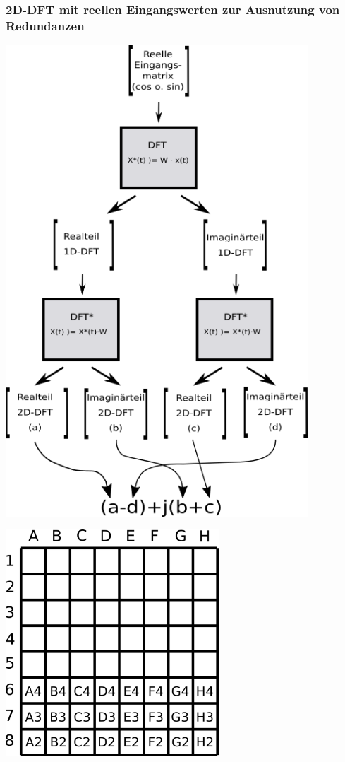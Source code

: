 \begin{frame}\frametitle{2D-DFT mit reellen Eingangswerten zur Ausnutzung von Redundanzen}
\begin{minipage}{0.48\textwidth}
\begin{center}
 \includegraphics[width=0.85\textwidth]{img/reelleMatMult.png}
\end{center}
\end{minipage}
\hfill
\begin{minipage}{0.48\textwidth}
 \begin{center}
 \includegraphics[width=0.6\textwidth]{img/reelleMatMultRedundanzRealteil.png} 
 

\end{center}
\end{minipage}
\end{frame}
